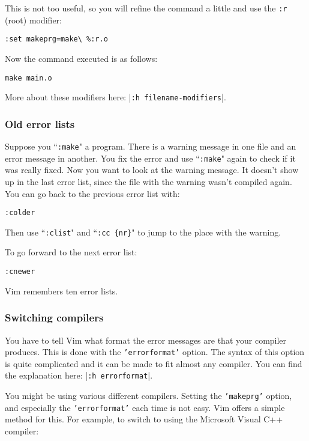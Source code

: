 This is not too useful, so you will refine the command a little and use the \texttt{:r} (root) modifier:

\begin{Verbatim}[samepage=true]
 :set makeprg=make\ %:r.o
\end{Verbatim}

Now the command executed is as follows:

\begin{Verbatim}[samepage=true]
 make main.o
\end{Verbatim}

More about these modifiers here: |\texttt{:h filename-modifiers}|.
\subsubsection{Old error lists}
Suppose you ``\texttt{:make}" a program.
There is a warning message in one file and an error message in another.
You fix the error and use ``\texttt{:make}" again to check if it was really fixed.
Now you want to look at the warning message.
It doesn't show up in the last error list, since the file with the warning wasn't compiled again.
You can go back to the previous error list with:

\begin{Verbatim}[samepage=true]
 :colder
\end{Verbatim}

Then use ``\texttt{:clist}" and ``\texttt{:cc \{nr\}}" to jump to the place with the warning.

To go forward to the next error list:

\begin{Verbatim}[samepage=true]
 :cnewer
\end{Verbatim}

Vim remembers ten error lists.
\subsubsection{Switching compilers}
You have to tell Vim what format the error messages are that your compiler produces.
This is done with the \texttt{'errorformat'} option.
The syntax of this option is quite complicated and it can be made to fit almost any compiler.
You can find the explanation here: |\texttt{:h errorformat}|.

You might be using various different compilers.
Setting the \texttt{'makeprg'} option, and especially the \texttt{'errorformat'} each time is not easy.
Vim offers a simple method for this.
For example, to switch to using the Microsoft Visual C++ compiler:

